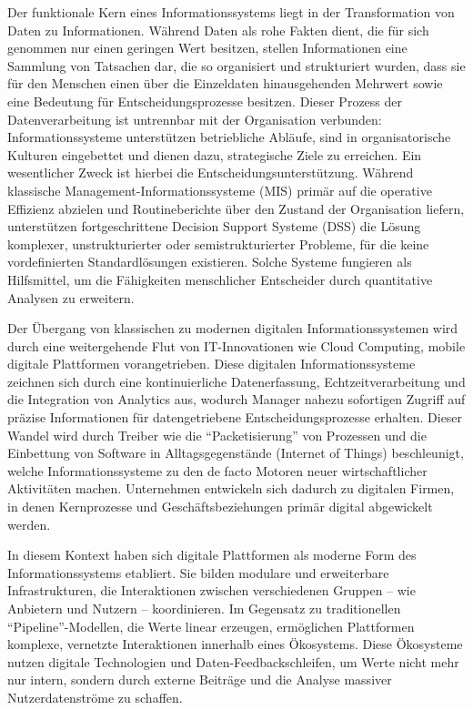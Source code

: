 Der funktionale Kern eines Informationssystems liegt in der Transformation von Daten zu Informationen. Während Daten als rohe Fakten dient, die für sich genommen nur einen geringen Wert besitzen, stellen Informationen eine Sammlung von Tatsachen dar, die so organisiert und strukturiert wurden, dass sie für den Menschen einen über die Einzeldaten hinausgehenden Mehrwert sowie eine Bedeutung für Entscheidungsprozesse besitzen. Dieser Prozess der Datenverarbeitung ist untrennbar mit der Organisation verbunden: Informationssysteme unterstützen betriebliche Abläufe, sind in organisatorische Kulturen eingebettet und dienen dazu, strategische Ziele zu erreichen. Ein wesentlicher Zweck ist hierbei die Entscheidungsunterstützung. Während klassische Management-Informationssysteme (\ac{MIS}) primär auf die operative Effizienz abzielen und Routineberichte über den Zustand der Organisation liefern, unterstützen fortgeschrittene Decision Support Systeme (\ac{DSS}) die Lösung komplexer, unstrukturierter oder semistrukturierter Probleme, für die keine vordefinierten Standardlösungen existieren. Solche Systeme fungieren als Hilfsmittel, um die Fähigkeiten menschlicher Entscheider durch quantitative Analysen zu erweitern.

Der Übergang von klassischen zu modernen digitalen Informationssystemen wird durch eine weitergehende Flut von IT-Innovationen wie Cloud Computing, mobile digitale Plattformen vorangetrieben. Diese digitalen Informationssysteme zeichnen sich durch eine kontinuierliche Datenerfassung, Echtzeitverarbeitung und die Integration von Analytics aus, wodurch Manager nahezu sofortigen Zugriff auf präzise Informationen für datengetriebene Entscheidungsprozesse erhalten. Dieser Wandel wird durch Treiber wie die \enquote{Packetisierung} von Prozessen und die Einbettung von Software in Alltagsgegenstände (Internet of Things) beschleunigt, welche Informationssysteme zu den de facto Motoren neuer wirtschaftlicher Aktivitäten machen. Unternehmen entwickeln sich dadurch zu digitalen Firmen, in denen Kernprozesse und Geschäftsbeziehungen primär digital abgewickelt werden.

In diesem Kontext haben sich digitale Plattformen als moderne Form des Informationssystems etabliert. Sie bilden modulare und erweiterbare Infrastrukturen, die Interaktionen zwischen verschiedenen Gruppen -- wie Anbietern und Nutzern -- koordinieren. Im Gegensatz zu traditionellen \enquote{Pipeline}-Modellen, die Werte linear erzeugen, ermöglichen Plattformen komplexe, vernetzte Interaktionen innerhalb eines Ökosystems. Diese Ökosysteme nutzen digitale Technologien und Daten-Feedbackschleifen, um Werte nicht mehr nur intern, sondern durch externe Beiträge und die Analyse massiver Nutzerdatenströme zu schaffen.

